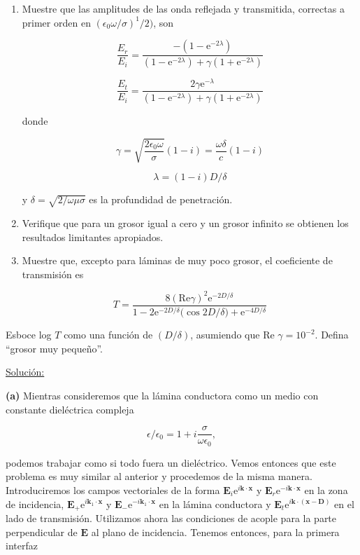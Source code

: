 \documentclass[a4paper,11pt]{article}
\numberwithin{equation}{section}
\newcommand{\euler}{\mathrm{e}}
\begin{document}
\begin{enumerate}[label=\textbf{(\alph*)}]
 \item Muestre que las amplitudes de las onda reflejada y transmitida, correctas 
 a primer orden en $(\epsilon_0 \omega /\sigma)^1/2)$, son 
 
 $$
 \frac{E_r}{E_i} = \frac{-(1 - \euler^{-2\lambda})}{(1 - \euler^{-2\lambda}) 
 + \gamma(1 + \euler^{-2\lambda})}
 $$
 
  $$
 \frac{E_t}{E_i} = \frac{2\gamma \euler^{-\lambda}}{(1 - \euler^{-2\lambda}) 
 + \gamma(1 + \euler^{-2\lambda})}
 $$
 
 donde 
 
 $$
 \gamma = \sqrt{\frac{2\epsilon_0 \omega}{\sigma}}(1 - i) = \frac{\omega \delta}{c}
 (1 - i)
 $$
 
 $$
 \lambda = (1-i)D/\delta
 $$
 
  y $\delta = \sqrt{2/\omega \mu \sigma}$ es la profundidad de penetración.
 
 \item Verifique que para un grosor igual a cero y un grosor infinito se obtienen 
 los resultados limitantes apropiados.
 \item Muestre que, excepto para láminas de muy poco grosor, el coeficiente de 
 transmisión es 
 
 $$
 T = \frac{8(\text{Re} \gamma)^2 \euler^{-2D/\delta}}{1 - 2\euler^{-2D/\delta} 
 (\cos{2D/\delta) + \euler^{-4D/\delta}}}
 $$
\end{enumerate}

Esboce log $T$ como una función de $(D/\delta)$, asumiendo que Re $\gamma = 10^{-2}$. 
Defina ``grosor muy pequeño''.

\vspace{.3cm}

\underline{Solución:} \vspace{.3cm}

\textbf{(a)} Mientras consideremos que la lámina conductora como un medio con 
constante dieléctrica compleja 

\begin{equation}
 \epsilon/\epsilon_0 = 1 + i\frac{\sigma}{\omega \epsilon_0},
\end{equation}

podemos trabajar como si todo fuera un dieléctrico. Vemos entonces que este problema 
es muy similar al anterior y procedemos de la misma manera. Introduciremos los 
campos vectoriales de la forma $\mathbf{E}_i \euler^{i\mathbf{k} \cdot \mathbf{x}}$ 
y $\mathbf{E}_r \euler^{- i\mathbf{k} \cdot \mathbf{x}}$ en la zona de incidencia, 
$\mathbf{E}_+ \euler^{i\mathbf{k}_1 \cdot \mathbf{x}}$ y 
$\mathbf{E}_- \euler^{-i\mathbf{k}_1 \cdot \mathbf{x}}$ en la lámina conductora y 
$\mathbf{E}_t \euler^{i\mathbf{k} \cdot (\mathbf{x} - \mathbf{D})}$ en el lado 
de transmisión. Utilizamos ahora las condiciones de acople para la parte perpendicular 
de $\mathbf{E}$ al plano de incidencia. Tenemos entonces, para la primera interfaz 
\end{document}
